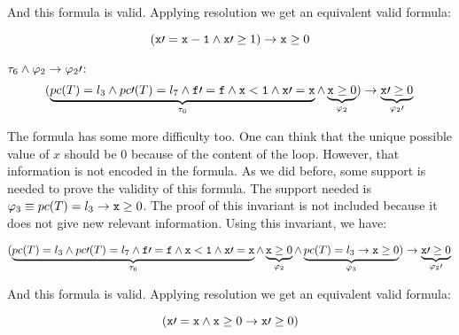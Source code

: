 	And this formula is valid. Applying resolution we get an equivalent valid formula:

	\[
		( \mathtt{x\prime =x-1} \wedge \mathtt{x\prime }\geq 1) \to \mathtt{x} \geq 0
	\]


	\; $\tau_6 \wedge \varphi_2 \to \varphi_2\prime $:
	\begin{equation*}
		(
			\underbrace{pc(T) = l_3 \wedge pc\prime (T) = l_7 \wedge \mathtt{f\prime =f} \wedge \mathtt{x<1} \wedge \mathtt{x\prime =x} }_{\tau_6} \wedge \underbrace{\mathtt{x} \geq 0}_{\varphi_2}
		) 
			\to \underbrace{\mathtt{x}\prime  \geq 0}_{\varphi_2\prime }\\\\
	\end{equation*}


	The formula has some more difficulty too.
	One can think that the unique possible value of $x$ should be $0$ because of the content of the loop.
	However, that information is not encoded in the formula.
	As we did before, some support is needed to prove the validity of this formula.
	The support needed is $\varphi_3 \equiv pc(T) = l_3 \to \mathtt{x} \geq 0$.
	The proof of this invariant is not included because it does not give new relevant information. 
	Using this invariant, we have:

	

	\begin{equation*}
		(
			\underbrace{pc(T) = l_3 \wedge pc\prime (T) = l_7 \wedge \mathtt{f\prime =f} \wedge \mathtt{x<1} \wedge \mathtt{x\prime =x}}_{\tau_6} \wedge \underbrace{\mathtt{x} \geq 0}_{\varphi_2} \wedge \underbrace{pc(T) = l_3 \to \mathtt{x}\geq 0 }_{\varphi_3}
		) 
			\to \underbrace{\mathtt{x}\prime  \geq 0}_{\varphi_2\prime }\\\\
	\end{equation*}

	
	And this formula is valid. Applying resolution we get an equivalent valid formula:

	\[
		(
			\mathtt{x\prime =x}  \wedge \mathtt{x}\geq 0 \to \mathtt{x\prime }\geq 0
		)
	\]


